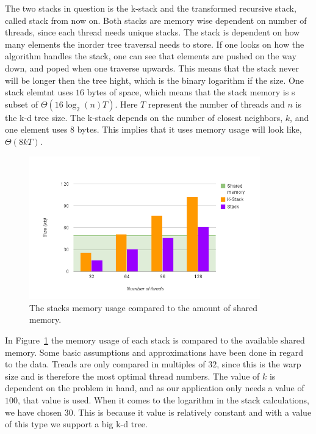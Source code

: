 The two stacks in question is the k-stack and the transformed recursive stack, called stack from now on. Both stacks are memory wise dependent on number of threads, since each thread needs unique stacks. The stack is dependent on how many elements the inorder tree traversal needs to store. If one looks on how the algorithm handles the stack, one can see that elements are pushed on the way down, and poped when one traverse upwards.  This means that the stack never will be longer then the tree hight, which is the binary logarithm if the size. One stack elemtnt uses $16$ bytes of space, which means that the stack memory is s subset of $\Theta(16\log_2(n)T)$. Here $T$ represent the number of threads and $n$ is the k-d tree size. The k-stack depends on the number of closest neighbors, $k$, and one element uses $8$ bytes. This implies that it uses memory usage will look like, $\Theta(8kT)$.


\begin{figure}[ht!]
\centering
\includegraphics[width=100mm]{../gfx/shared_memory_and_stack.png}

\caption{The stacks memory usage compared to the amount of shared memory.}
\label{fig:stacks_and_shared_memory}
\end{figure}


In Figure~\ref{fig:stacks_and_shared_memory} the memory usage of each stack is compared to the available shared memory. Some basic assumptions and approximations have been done in regard to the data. Treads are only compared in multiples of $32$, since this is the warp size and is therefore the most optimal thread numbers. The value of $k$ is dependent on the problem in hand, and as our application only needs a value of $100$, that value is used. When it comes to the logarithm in the stack calculations, we have chosen $30$.  This is because it value is relatively constant and with a value of this type we support a  big k-d tree.



